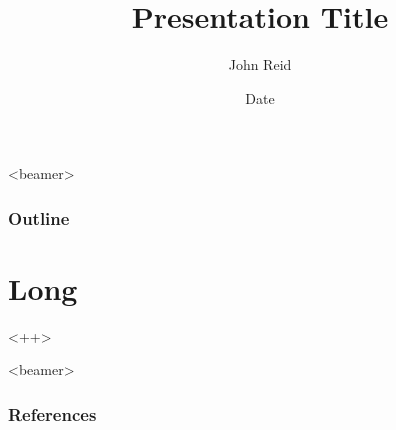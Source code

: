\documentclass{beamer}
\title{Presentation Title}
\author{John Reid}
\date{Date}
\begin{document}
\maketitle

\begin{frame}<beamer>
  \frametitle{Outline}
  \tableofcontents
\end{frame}

\section[Short]{Long}


<++>

\begin{frame}<beamer>
  \frametitle{References}

  \printbibliography
\end{frame}
\end{document}
